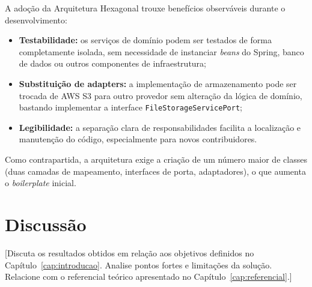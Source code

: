 A adoção da Arquitetura Hexagonal trouxe benefícios observáveis durante o
desenvolvimento:

\begin{itemize}
  \item \textbf{Testabilidade:} os serviços de domínio podem ser testados de
        forma completamente isolada, sem necessidade de instanciar \textit{beans}
        do Spring, banco de dados ou outros componentes de infraestrutura;

  \item \textbf{Substituição de adapters:} a implementação de armazenamento
        pode ser trocada de AWS S3 para outro provedor sem alteração da lógica
        de domínio, bastando implementar a interface \texttt{FileStorageServicePort};

  \item \textbf{Legibilidade:} a separação clara de responsabilidades facilita
        a localização e manutenção do código, especialmente para novos
        contribuidores.
\end{itemize}

Como contrapartida, a arquitetura exige a criação de um número maior de classes
(duas camadas de mapeamento, interfaces de porta, adaptadores), o que aumenta
o \textit{boilerplate} inicial.

\section{Discussão}
\label{sec:discussao}

[Discuta os resultados obtidos em relação aos objetivos definidos no
Capítulo~\ref{cap:introducao}. Analise pontos fortes e limitações da
solução. Relacione com o referencial teórico apresentado no
Capítulo~\ref{cap:referencial}.]
